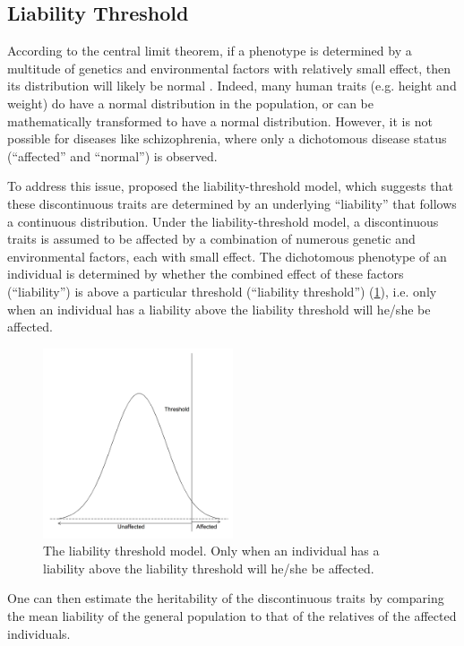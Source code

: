 \documentclass[12pt]{scrbook}
\newcommand*{\scz}{schizophrenia}
\begin{document}
\subsection{Liability Threshold}
\label{sec:liability}
According to the central limit theorem, if a phenotype is determined by a multitude of genetics and environmental factors with relatively small effect, then its distribution will likely be normal \citep{Visscher2008}.
Indeed, many human traits (e.g. height and weight) do have a normal distribution in the population, or can be mathematically transformed to have a normal distribution. 
However, it is not possible for diseases like \scz, where only a dichotomous disease status (``affected'' and ``normal'') is observed. 

To address this issue, \citet{Falconer1965} proposed the liability-threshold model, which suggests that these discontinuous traits are determined by an underlying ``liability'' that follows a continuous distribution.
Under the liability-threshold model, a discontinuous traits is assumed to be affected by a combination of numerous genetic and environmental factors, each with small effect.
The dichotomous phenotype of an individual is determined by whether the combined effect of these factors (``liability'') is above a particular threshold (``liability threshold'') (\cref{fig:liability}), i.e. only when an individual has a liability above the liability threshold will he/she be affected.
\begin{figure}
	\centering
	\includegraphics[width=0.5\textwidth]{figure/liability.png}
	\caption[Liability Threshold Model]{
		The liability threshold model.
		Only when an individual has a liability above the liability threshold will he/she be affected.
	}
	\label{fig:liability}
\end{figure}
One can then estimate the heritability of the discontinuous traits by comparing the mean liability of the general population to that of the relatives of the affected individuals.	
\end{document}

